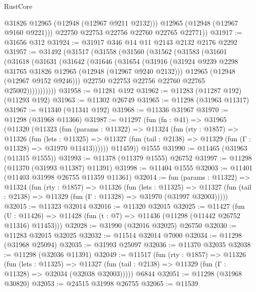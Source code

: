 \begin{lexlean}{RustCore}
\begin{coremodule}
            @31826
            @12965
            (@12948 (@12967 @9211 @2132)))
          @12965
          (@12948 (@12967 @9160 @9221)))
        @22750
        @22753
        @22756
        @22760
        @22765
        @22771))
@31917 := @31656 @312
@31924 := @31917 @346 @14 @11 @2143 @2132 @2176 @2292
@31957 := @31492
    (@31517
      (@31558
        (@31560
          (@31562
            (@31583
              (@31601
                (@31618
                  (@31631
                    (@31642
                      (@31646
                        (@31654
                          (@31916
                            (@31924 @9239 @2298 @31765 @31826 @12965 (@12948 (@12967 @9240 @2132)))
                            @12965
                            (@12948 (@12967 @9152 @9246)))
                          @22750
                          @22753
                          @22756
                          @22760
                          @22765
                          @25002)))))))))))
@31958 := @11281 @192
@31962 := @11283 (@11287 @192) (@11293 @192)
@31963 := @11302 @26749
@31965 := @11298 (@31963 @11317)
@31967 := @11340 (@11341 @192)
@31968 := @11336 @31967
@31970 := @11298 (@31968 @11366)
@31987 := @11297
    (fun (fn : @41) =>
    @31965
      (@11320
        (@11323
          (fun (params : @11322) =>
          @11324
            (fun (rty : @1857) =>
            @11326
              (fun (lets : @11325) =>
              @11327 (fun (tail : @2138) => @11329 (fun (Γ : @11328) => @31970 @11413))))))
        @11459))
    @1555
@31990 := @11465 (@31963 (@11315 @1555))
@31993 := @11378 (@11379 @1555) @26752
@31997 := @11298 (@11370 (@31993 @11387) @11391)
@31998 := @11404 @1555
@32003 := @11401 (@11403 @31998 @26755 @11359 @11361)
@32014 := fun (params : @11322) =>
  @11324
    (fun (rty : @1857) =>
    @11326
      (fun (lets : @11325) =>
      @11327 (fun (tail : @2138) => @11329 (fun (Γ : @11328) => @31970 (@31997 @32003)))))
@32015 := @11323 @32014
@32016 := @11320 @32015
@32025 := @11427
    (fun (U : @11426) => @11428 (fun (t : @7) => @11436 (@11298 (@11442 @26752 @11316) @11453)))
@32028 := @31990 (@32016 @32025) @26750
@32030 := @11283 @32015 @32025
@32032 := @11514 @32014 @7000
@32034 := @11298 (@31968 @25094)
@32035 := @31993 @25097
@32036 := @11370 @32035
@32038 := @11298 (@32036 @11391)
@32049 := @11517
    (fun (rty : @1857) =>
    @11326
      (fun (lets : @11325) =>
      @11327 (fun (tail : @2138) => @11329 (fun (Γ : @11328) => @32034 (@32038 @32003)))))
    @6844
@32051 := @11298 (@31968 @30820)
@32053 := @24515 @31998 @26755
@32065 := @11539

\end{coremodule}
\end{lexlean}
